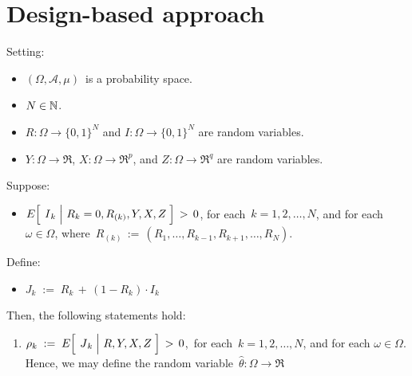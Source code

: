 

\section{Design-based approach}
\setcounter{theorem}{0}
\setcounter{equation}{0}


\renewcommand{\theenumi}{\roman{enumi}}
\renewcommand{\labelenumi}{\textnormal{(\theenumi)}$\;\;$}



\begin{proposition}
\mbox{}
\vskip 0.1cm
\noindent
Setting:
\begin{itemize}
\item
	$(\Omega,\mathcal{A},\mu)$\, is a probability space.
\item
	$N \in \mathbb{N}$.
\item
	$R : \Omega \longrightarrow \{0,1\}^{N}$\; and
	$I : \Omega \longrightarrow \{0,1\}^{N}$
	are random variables.
\item
	$Y : \Omega \longrightarrow \Re$,\;
	$X : \Omega \longrightarrow \Re^{p}$,\; and\;
	$Z : \Omega \longrightarrow \Re^{q}$
	are random variables.
\end{itemize}
Suppose:
\begin{itemize}
\item
	$E\!\left[\;\left.\overset{{\color{white}.}}{I}_{k}\;\right\vert\,R_{k}=0,R_{(k)},Y,X,Z\;\right] \, > \, 0$,\;
	for each \,$k = 1, 2, \ldots, N$, and for each $\omega \in \Omega$,
	\vskip 0.05cm
	where \,$R_{(k)} \, := \, (R_{1},\ldots,R_{k-1},R_{k+1},\ldots,R_{N})$.
\end{itemize}
\vskip 0.3cm
\noindent
Define:
\begin{itemize}
\item
	$J_{k} \; := \; R_{k} \, + \, (1-R_{k}) \cdot I_{k}$
\end{itemize}
\vskip 0.3cm
\noindent
Then, the following statements hold:
\begin{enumerate}
\item
	$\rho_{k} \; := \; E\!\left[\;\left.\overset{{\color{white}.}}{J}_{k}\;\right\vert\,R,Y,X,Z\;\right] \, > \, 0$,\,
	for each \,$k = 1, 2, \ldots, N$, and for each $\omega \in \Omega$.
	\vskip 0.05cm
	\noindent
	Hence, we may define the random variable
	\,$\widehat{\theta} : \Omega \longrightarrow \Re$\,

\end{enumerate}
\end{proposition}
